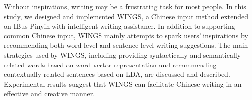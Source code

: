 Without inspirations, writing may be a frustrating task for most people. In this study, we designed and implemented WINGS, a Chinese input method extended on IBus-Pinyin with intelligent writing assistance. In addition to supporting common Chinese input, WINGS mainly attempts to spark users' inspirations by recommending both word level and sentence level writing suggestions. The main strategies used by WINGS, including providing syntactically and semantically related words based on word vector representation and recommending contextually related sentences based on LDA, are discussed and described. Experimental results suggest that WINGS can facilitate Chinese writing in an effective and creative manner.
